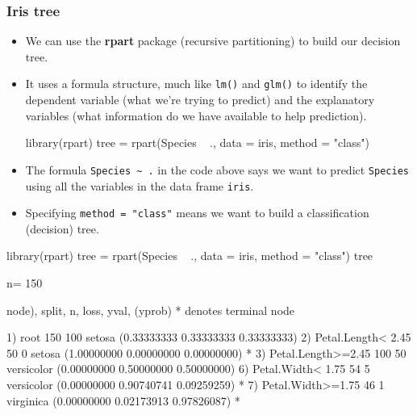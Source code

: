 \documentclass[a4paper]{article}
\begin{document}
\subsubsection{Iris tree}
\begin{itemize}
	\item We can use the \textbf{rpart} package (recursive partitioning) to build our decision tree.
	\item It uses a formula structure, much like \lstinline|lm()| and \lstinline|glm()| to identify the dependent variable (what we're trying to predict) and the explanatory variables (what information do we have available to help prediction).
\begin{Schunk}
\begin{Sinput}
library(rpart)
tree = rpart(Species ~ ., data = iris, method = "class")
\end{Sinput}
\end{Schunk}
	\item The formula \lstinline|Species ~ .| in the code above says we want to predict \lstinline|Species| using all the variables in the data frame \lstinline|iris|.
	\item Specifying \lstinline|method = "class"| means we want to build a classification (decision) tree.
\end{itemize}
\begin{Schunk}
\begin{Sinput}
library(rpart)
tree = rpart(Species ~ ., data = iris, method = "class")
tree
\end{Sinput}
\begin{Soutput}
n= 150 

node), split, n, loss, yval, (yprob)
      * denotes terminal node

1) root 150 100 setosa (0.33333333 0.33333333 0.33333333)  
  2) Petal.Length< 2.45 50   0 setosa (1.00000000 0.00000000 0.00000000) *
  3) Petal.Length>=2.45 100  50 versicolor (0.00000000 0.50000000 0.50000000)  
    6) Petal.Width< 1.75 54   5 versicolor (0.00000000 0.90740741 0.09259259) *
    7) Petal.Width>=1.75 46   1 virginica (0.00000000 0.02173913 0.97826087) *
\end{Soutput}
\end{Schunk}
\end{document}
